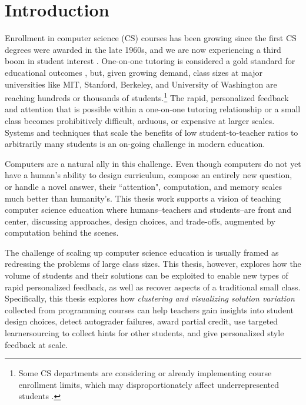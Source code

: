 \chapter{Introduction}\label{chapter:introduction}

Enrollment in computer science (CS) courses has been growing since the first CS degrees were awarded in the late 1960s, and we are now experiencing a third boom in student interest \cite{csBoom}. One-on-one tutoring is considered a gold standard for educational outcomes \cite{bloom}, but, given growing demand, class sizes at major universities like MIT, Stanford, Berkeley, and University of Washington are reaching hundreds or thousands of students.\footnote{Some CS departments are considering or already implementing course enrollment limits, which may disproportionately affect underrepresented students \cite{personalconversationwithjasonchuang}.} The rapid, personalized feedback and attention that is possible within a one-on-one tutoring relationship or a small class becomes prohibitively difficult, arduous, or expensive at larger scales. Systems and techniques that scale the benefits of low student-to-teacher ratios to arbitrarily many students is an on-going challenge in modern education.

Computers are a natural ally in this challenge. Even though computers do not yet have a human's ability to design curriculum, compose an entirely new question, or handle a novel answer, their ``attention", computation, and memory scales much better than humanity's. This thesis work supports a vision of teaching computer science education where humans--teachers and students--are front and center, discussing approaches, design choices, and trade-offs, augmented by computation behind the scenes.

The challenge of scaling up computer science education is usually framed as redressing the problems of large class sizes. This thesis, however, explores how the volume of students and their solutions can be exploited to enable new types of rapid personalized feedback, as well as recover aspects of a traditional small class. Specifically, this thesis explores how {\it clustering and visualizing solution variation} collected from programming courses can help teachers gain insights into student design choices, detect autograder failures, award partial credit, use targeted learnersourcing to collect hints for other students, and give personalized style feedback at scale.

